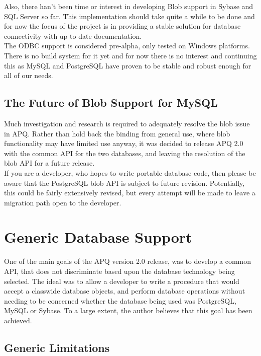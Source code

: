 \documentclass[english,letterpaper]{book}
\begin{document}
Also, there han't been time or interest in developing Blob support in Sybase and SQL Server
so far. This implementation should take quite a while to be done and for now the focus of 
the project is in providing a stable solution for database connectivity with up to date documentation.\\


The ODBC support is considered pre-alpha, only tested on Windows platforms.
There is no build system for it yet and for now there is no interest and continuing this as
MySQL and PostgreSQL have proven to be stable and robust enough for all of our needs.


\subsection{The Future of Blob Support for MySQL}

Much investigation and research is required to adequately resolve
the blob issue in APQ. Rather than hold back the binding from general
use, where blob functionality may have limited use anyway, it was
decided to release APQ 2.0 with the common API for the two databases,
and leaving the resolution of the blob API for a future release.\\

If you are a developer, who hopes to write portable database code,
then please be aware that the PostgreSQL blob API is subject to future
revision. Potentially, this could be fairly extensively revised, but
every attempt will be made to leave a migration path open to the developer.


\section{Generic Database Support}

One of the main goals of the APQ version 2.0 release, was to develop
a common API, that does not discriminate based upon the database technology
being selected. The ideal was to allow a developer to write a procedure
that would accept a classwide database objects, and perform database
operations without needing to be concerned whether the database being
used was PostgreSQL, MySQL or Sybase.
To a large extent, the author believes that this goal has been achieved.


\subsection{Generic Limitations}
\end{document}
